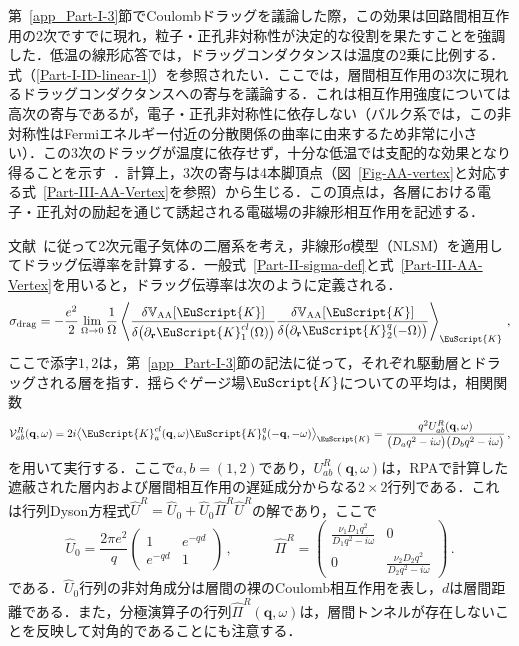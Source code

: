 \documentclass[a4paper,11pt]{ltjsarticle}
\def\qo{(\mathbf{q},\omega)}
\def\qom{(-\mathbf{q},-\omega)}
\begin{document}
第~\ref{app_Part-I-3}節でCoulombドラッグを議論した際，この効果は回路間相互作用の2次ですでに現れ，粒子・正孔非対称性が決定的な役割を果たすことを強調した．低温の線形応答では，ドラッグコンダクタンスは温度の2乗に比例する．式（\ref{Part-I-ID-linear-1}）を参照されたい．ここでは，層間相互作用の3次に現れるドラッグコンダクタンスへの寄与を議論する．これは相互作用強度については高次の寄与であるが，電子・正孔非対称性に依存しない（バルク系では，この非対称性はFermiエネルギー付近の分散関係の曲率に由来するため非常に小さい）．この3次のドラッグが温度に依存せず，十分な低温では支配的な効果となり得ることを示す~\cite{Drag-Third-order}．計算上，3次の寄与は4本脚頂点（図~\ref{Fig-AA-vertex}と対応する式~\eqref{Part-III-AA-Vertex}を参照）から生じる．この頂点は，各層における電子・正孔対の励起を通じて誘起される電磁場の非線形相互作用を記述する．

文献~\cite{Drag-Third-order}に従って2次元電子気体の二層系を考え，非線形σ模型（NLSM）を適用してドラッグ伝導率を計算する．一般式~\eqref{Part-II-sigma-def}と式~\eqref{Part-III-AA-Vertex}を用いると，ドラッグ伝導率は次のように定義される．
\begin{equation}\label{Part-III-sigma-drag}
\sigma_{\mathrm{drag}}=-\frac{e^2}{2}\lim_{\Omega\to0}\frac{1}{\Omega}
\left\langle\frac{\delta\mathbb{V}_{\mathrm{AA}}[\EuScript{K}]}
{\delta\big(\partial_{\mathbf{r}}\EuScript{K}^{cl}_{1}(\Omega)\big)}
\frac{\delta\mathbb{V}_{\mathrm{AA}}[\EuScript{K}]}
{\delta\big(\partial_{\mathbf{r}}\EuScript{K}^{q}_{2}(-\Omega)\big)}
\right\rangle_{\EuScript{K}}\,,
\end{equation}
ここで添字$1,2$は，第~\ref{app_Part-I-3}節の記法に従って，それぞれ駆動層とドラッグされる層を指す．揺らぐゲージ場$\EuScript{K}$についての平均は，相関関数
\begin{equation}\label{Part-III-V-drag}
\mathcal{V}_{ab}^R\qo=2i\big\langle
\EuScript{K}^{cl}_{a}\qo\EuScript{K}^{q}_{b}\qom\big\rangle_{\EuScript{K}}=
\frac{q^2 {U}^{R}_{ab}\qo}{\big(D_{a}q^2-i\omega\big)\big(D_{b}q^{2}-i\omega\big)}\,,
\end{equation}
を用いて実行する．ここで$a,b=(1,2)$であり，$U^R_{ab}\qo$は，RPAで計算した遮蔽された層内および層間相互作用の遅延成分からなる$2\times2$行列である．これは行列Dyson方程式$\hat{U}^R=\hat{U}_{0}+\hat{U}_{0}\hat{\Pi}^R\hat{U}^R$の解であり，ここで
\begin{equation}\label{Part-III-RPA}
\hat{U}_{0}=\frac{2\pi e^{2}}{q}\!\left(\begin{array}{cc}
1 & e^{-qd}
\\ e^{-qd} & 1
\end{array}\right)\,,\qquad\quad
\hat{\Pi}^R=\left(\begin{array}{cc} \frac{\nu_{1}D_{1}q^{2}}
{D_{1}q^{2}-i\omega} & 0 \\ 0 & \frac{\nu_{2}D_{2}q^{2}}
{D_{2}q^{2}-i\omega}\end{array}\right)\,.
\end{equation}
である．$\hat{U}_{0}$行列の非対角成分は層間の裸のCoulomb相互作用を表し，$d$は層間距離である．また，分極演算子の行列$\hat{\Pi}^R\qo$は，層間トンネルが存在しないことを反映して対角的であることにも注意する．
\end{document}
